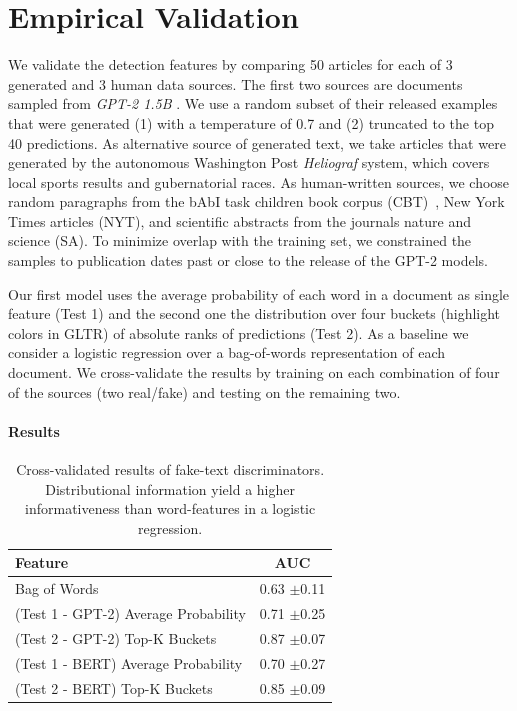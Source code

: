\documentclass[11pt,a4paper]{article}
\begin{document}
\section{Empirical Validation}

We validate the detection features by comparing 50 articles for each of 3 generated and 3 human data sources. The first two sources are documents sampled from \emph{GPT-2 1.5B} \cite{radford2019language}. We use a random subset of their released examples that were generated (1) with a temperature of 0.7 and (2) truncated to the top 40 predictions. As alternative source of generated text, we take articles that were generated by the autonomous Washington Post \emph{Heliograf} system, which covers local sports results and gubernatorial races.
As human-written sources, we choose random paragraphs from the bAbI task children book corpus (CBT)~\citep{hill2015goldilocks}, New York Times articles (NYT), and scientific abstracts from the journals nature and science (SA). To minimize overlap with the training set, we constrained the samples to publication dates past or close to the release of the GPT-2 models.

Our first model uses the average probability of each word in a document as single feature (Test 1) and the second one the distribution over four buckets (highlight colors in GLTR) of absolute ranks of predictions (Test 2). As a baseline we consider a logistic regression over a bag-of-words representation of each document. We cross-validate the results by training on each combination of four of the sources (two real/fake) and testing on the remaining two.

\paragraph{Results}


\begin{table}[t!]
\begin{center}
\begin{tabular}{@{}lc@{}}
\toprule
Feature & AUC \\ \midrule
Bag of Words & 0.63 $\pm$0.11 \\ \midrule
(Test 1 - GPT-2) Average Probability & 0.71 $\pm$0.25 \\
(Test 2 - GPT-2) Top-K Buckets & 0.87 $\pm$0.07 \\ \midrule
(Test 1 - BERT) Average Probability & 0.70 $\pm$0.27 \\
(Test 2 - BERT) Top-K Buckets & 0.85 $\pm$0.09 \\ \bottomrule
\end{tabular}
\end{center}
\caption{Cross-validated results of fake-text discriminators. Distributional information yield a higher informativeness than word-features in a logistic regression.}
\label{tab:lr}
\end{table}
\end{document}
